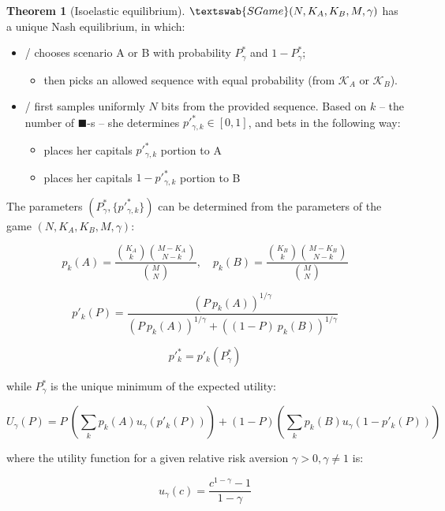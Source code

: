 \documentclass{article}
\newcommand{\bb}{\blacksquare}
\theoremstyle{definition}
\newtheorem{theorem}{Theorem}[section]
\newcommand{\SG}[1]{$\textswab{SGame}(#1)$}
\begin{document}
\begin{theorem}[Isoelastic equilibrium]
\label{thm:StatisticalGameEquilibrium}
\SG{N,K_A,K_B,M,\gamma} has a unique Nash equilibrium, in which:

\begin{itemize}
    \item \PII/ chooses scenario A or B with probability $P^*_\gamma$ and $1-P^*_\gamma$;
    \begin{itemize}
        \item then picks an allowed sequence with equal probability (from $\mathcal{K}_A$ or $\mathcal{K}_B$).
    \end{itemize}

    \item \PI/ first samples uniformly $N$ bits from the provided sequence. Based on $k$ -- the number of $\bb$-s -- she determines $p'^*_{\gamma,k} \in [0,1]$, and bets in the following way:
    \begin{itemize}
        \item places her capitals $p'^*_{\gamma,k}$ portion to A
        \item places her capitals $1-p'^*_{\gamma,k}$ portion to B
    \end{itemize}
\end{itemize}

The parameters $(P^*_\gamma, \{p'^*_{\gamma,k}\})$ can be determined from the parameters of the game $(N, K_A, K_B, M, \gamma)$:

\begin{equation}
    \label{thm:StatisticalEqHypergeom}
    p_k(A) = \frac{\binom{K_A}{k} \binom{M-K_A}{N-k}}{\binom{M}{N}}, \quad
    p_k(B) = \frac{\binom{K_B}{k} \binom{M-K_B}{N-k}}{\binom{M}{N}}
\end{equation}

\begin{equation}
\label{eq:ppkPgamma}
    p'_k(P) = \frac{\left ( P \ p_k(A) \right )^{1/\gamma}}{\left ( P \ p_k(A) \right )^{1/\gamma} + \left ( (1-P) \ p_k(B) \right )^{1/\gamma}}
\end{equation}

\begin{equation}
    p'^*_k = p'_k(P^*_\gamma)
\end{equation}

while $P^*_\gamma$ is the unique minimum of the expected utility:

\begin{equation}
    \label{eq:SGameExpectedUtility}
    U_\gamma(P) = P \ \left ( \sum_k p_k(A) u_\gamma(p'_k(P)) \right ) 
    + (1-P) \left ( \sum_k p_k(B) u_\gamma(1-p'_k(P)) \right )
\end{equation}

where the utility function for a given relative risk aversion $\gamma>0, \gamma \ne 1$ is:

\begin{equation}
    u_\gamma(c) = \frac{c^{1-\gamma}-1}{1-\gamma}
\end{equation}

\end{theorem}
\end{document}
